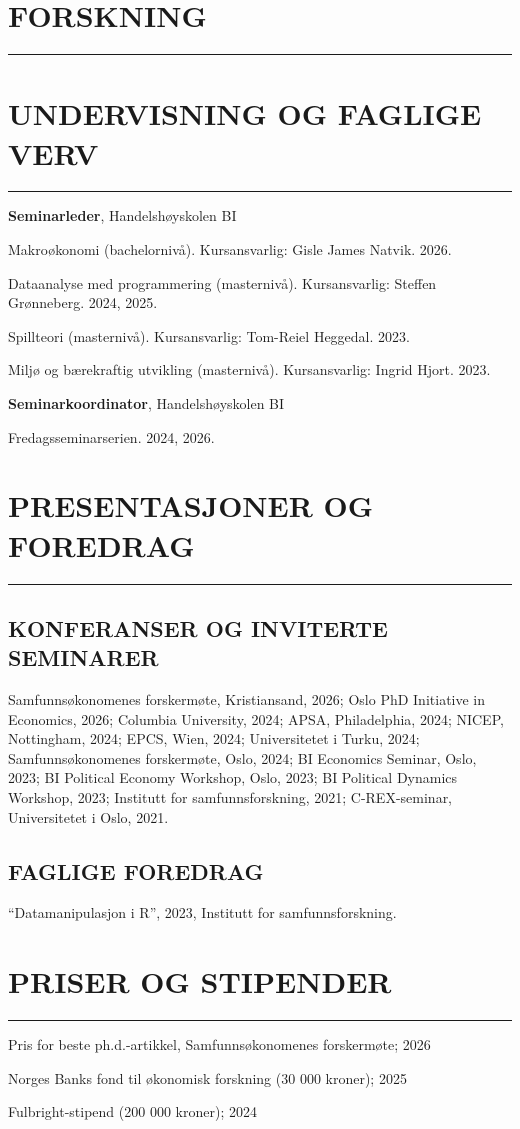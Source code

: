 \documentclass{article}
\newcommand{\cvsection}[1]{\section*{\normalfont#1} \vspace{-0.15cm}\hrule \hspace{1.6em}}
\newcommand{\cvsubsection}[1]{\vspace{-0.5cm}\subsection*{\normalfont#1}}
\begin{document}
\cvsection{FORSKNING}


\newpage
\cvsection{UNDERVISNING OG FAGLIGE VERV}

\noindent
\hspace{0.4em}
\textbf{Seminarleder}, Handelsh{\o}yskolen BI

Makro{\o}konomi (bachelorniv{\aa}). Kursansvarlig: Gisle James Natvik. 2026.

Dataanalyse med programmering (masterniv{\aa}). Kursansvarlig: Steffen Gr{\o}nneberg. 2024, 2025.

Spillteori (masterniv{\aa}). Kursansvarlig: Tom-Reiel Heggedal. 2023.

Milj{\o} og b{\ae}rekraftig utvikling (masterniv{\aa}). Kursansvarlig: Ingrid Hjort. 2023.

\noindent
\hspace{0.4em}
\textbf{Seminarkoordinator}, Handelsh{\o}yskolen BI

Fredagsseminarserien. 2024, 2026.


\cvsection{PRESENTASJONER OG FOREDRAG}
\cvsubsection{KONFERANSER OG INVITERTE SEMINARER}

\noindent
\hfill\begin{minipage}{\dimexpr\textwidth-0.4em}
Samfunns{\o}konomenes forskerm{\o}te, Kristiansand, 2026; Oslo PhD Initiative in Economics, 2026; Columbia University, 2024; APSA, Philadelphia, 2024; NICEP, Nottingham, 2024; EPCS, Wien, 2024; Universitetet i Turku, 2024; Samfunns{\o}konomenes forskerm{\o}te, Oslo, 2024; BI Economics Seminar, Oslo, 2023; BI Political Economy Workshop, Oslo, 2023; BI Political Dynamics Workshop, 2023; Institutt for samfunnsforskning, 2021; C-REX-seminar, Universitetet i Oslo, 2021.
\end{minipage}

\vspace{1em}
\cvsubsection{FAGLIGE FOREDRAG}

\noindent
\hspace{0.4em}
``Datamanipulasjon i R'', 2023, Institutt for samfunnsforskning.

\cvsection{PRISER OG STIPENDER}

\noindent
\hspace{0.4em}
Pris for beste ph.d.-artikkel, Samfunns{\o}konomenes forskerm{\o}te; 2026

\noindent
\hspace{0.4em}
Norges Banks fond til {\o}konomisk forskning (30 000 kroner); 2025

\noindent
\hspace{0.4em}
Fulbright-stipend (200 000 kroner); 2024
\end{document}
